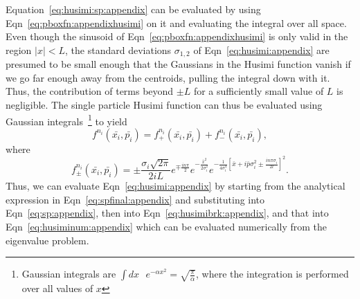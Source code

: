 Equation~\ref{eq:husimi:sp:appendix} can be evaluated by using Eqn~\ref{eq:pboxfn:appendixhusimi} on it and evaluating the integral over all space. Even though the sinusoid of Eqn~\ref{eq:pboxfn:appendixhusimi} is only valid in the region $|x|<L$, the standard deviations $\sigma_{1,2}$ of Eqn~\ref{eq:husimi:appendix} are presumed to be small enough that the Gaussians in the Husimi function vanish if we go far enough away from the centroids, pulling the integral down with it. Thus, the contribution of terms beyond $\pm L$ for a sufficiently small value of $L$ is negligible. The single particle Husimi function can thus be evaluated using Gaussian integrals~\footnote{Gaussian integrals are $\int dx \mbox{ } e^{-\alpha x^2}=\sqrt{\frac{\pi}{\alpha}}$, where the integration is performed over all values of $x$} to yield
\begin{equation}
 f^{n_i}(\bar{x_i},\bar{p_i}) =  f^{n_i}_+(\bar{x_i},\bar{p_i}) +  f^{n_i}_-(\bar{x_i},\bar{p_i}),
\label{eq:sp:appendix}
\end{equation}
where
\begin{equation}
 f^{n_i}_\pm(\bar{x_i},\bar{p_i}) = \pm \frac{\sigma_i \sqrt{2\pi}}{2iL}e^{\mp \frac{in\pi}{2}} e^{-\frac{\bar{x}^2}{2\sigma^2_i}} e^{-\frac{1}{4\sigma^4_i}\left[ \bar{x} + i \bar{p}\sigma^2_i \pm \frac{in\pi\sigma_i}{2l} \right]^2}.
 \label{eq:spfinal:appendix}
\end{equation}
Thus, we can evaluate Eqn~\ref{eq:husimi:appendix} by starting from the analytical expression in Eqn~\ref{eq:spfinal:appendix} and substituting into Eqn~\ref{eq:sp:appendix}, then into Eqn~\ref{eq:husimibrk:appendix}, and that into Eqn~\ref{eq:husiminum:appendix} which can be evaluated numerically from the eigenvalue problem.

